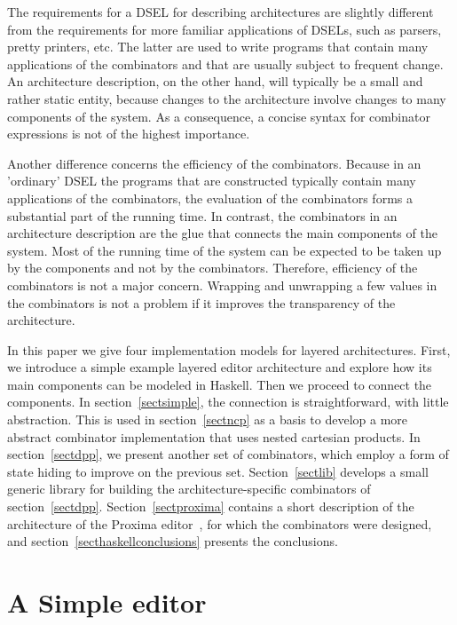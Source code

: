 The requirements for a DSEL for describing architectures are slightly different from the requirements for more familiar applications of DSELs, such as parsers, pretty printers, etc. The latter are used to write programs that contain many applications of the combinators and that are usually subject to frequent change. An architecture description, on the other hand, will typically be a small and rather static entity, because changes to the architecture involve changes to many components of the system.  As a consequence, a concise syntax for combinator expressions is not of the highest importance.

Another difference concerns the efficiency of the combinators. Because in an 'ordinary' DSEL the programs that are constructed typically contain many applications of the combinators, the evaluation of the combinators forms a substantial part of the running time. In contrast, the combinators in an architecture description are the glue that connects the main components of the system. Most of the running time of the system can be expected to be taken up by the components and not by the combinators. Therefore, efficiency of the combinators is not a major concern. Wrapping and unwrapping a few values in the combinators is not a problem if it improves the transparency of the architecture.

In this paper we give four implementation models for layered architectures. First, we introduce a simple example layered editor architecture and explore how its main components can be modeled in Haskell. Then we proceed to connect the components. In section~\ref{sectsimple}, the connection is straightforward, with little abstraction. This is used in section~\ref{sectncp} as a basis to develop a more abstract combinator implementation that uses nested cartesian products. In section~\ref{sectdpp}, we present another set of combinators, which employ a form of state hiding to improve on the previous set. Section~\ref{sectlib} develops a small generic library for building the architecture-specific combinators of section~\ref{sectdpp}. Section~\ref{sectproxima} contains a short description of the architecture of the Proxima editor~\cite{proxima}, for which the combinators were designed, and section~\ref{secthaskellconclusions} presents the conclusions.


%																
%																
%																
\section{A Simple editor}

